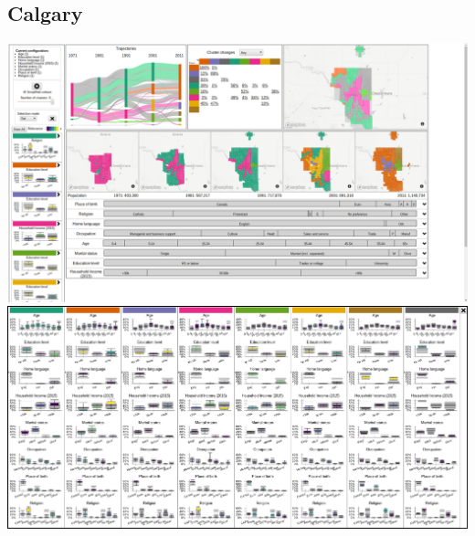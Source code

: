 \documentclass[a4paper]{article}
\begin{document}
\subsection{Calgary}
\begin{center}
	\includegraphics[width=\linewidth]{1a.png}
	\includegraphics[width=\linewidth]{1b.png}
\end{center}
\end{document}
